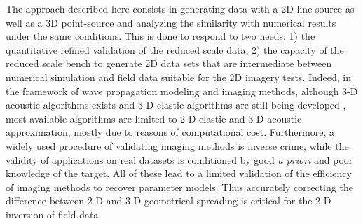 \documentclass[manuscript,revised]{geophysics}
\newcommand{\twod}{2-D }
\newcommand{\thrd}{3-D }
\begin{document}
\noindent The approach described here consists in generating data with a 2D line-source as well as a 3D point-source and analyzing the similarity with numerical results under the same conditions. This is done to respond to two needs: 1) the quantitative refined validation of the reduced scale data, 2) the capacity of the reduced scale bench to generate 2D data sets that are intermediate between numerical simulation and field data suitable for the 2D imagery tests. Indeed, in the framework of wave propagation modeling and imaging methods, although \thrd acoustic algorithms exists \citep{benhadjali_FWI_2008,plessix_FWI_2010} and \thrd elastic algorithms are still being developed \citep{castellanos_AMD_2011,Borisov_FWI_2015}, most available algorithms are limited to \twod elastic and \thrd acoustic approximation, mostly due to reasons of computational cost. Furthermore, a widely used procedure of validating imaging methods is inverse crime, while the validity of applications on real datasets is conditioned by good \textit{a priori} and poor knowledge of the target. All of these lead to a limited validation of the efficiency of imaging methods to recover parameter models. Thus accurately correcting the difference between \twod and \thrd geometrical spreading is critical for the \twod inversion of field data.


\end{document}
